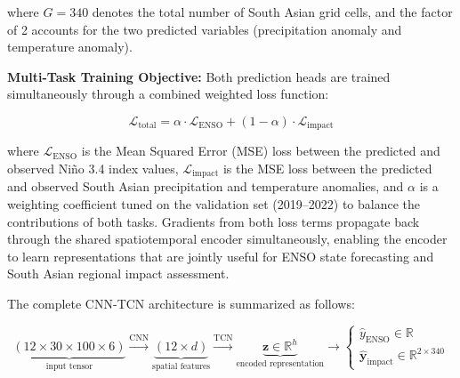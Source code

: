 \noindent where $G = 340$ denotes the total number of South Asian grid cells, and the factor of 2 accounts for the two predicted variables (precipitation anomaly and temperature anomaly).

\textbf{Multi-Task Training Objective:} Both prediction heads are trained simultaneously through a combined weighted loss function:

\begin{equation}
\mathcal{L}_{\text{total}} = \alpha \cdot \mathcal{L}_{\text{ENSO}} + (1 - \alpha) \cdot \mathcal{L}_{\text{impact}}
\end{equation}

\noindent where $\mathcal{L}_{\text{ENSO}}$ is the Mean Squared Error (MSE) loss between the predicted and observed Ni\~{n}o 3.4 index values, $\mathcal{L}_{\text{impact}}$ is the MSE loss between the predicted and observed South Asian precipitation and temperature anomalies, and $\alpha$ is a weighting coefficient tuned on the validation set (2019--2022) to balance the contributions of both tasks. Gradients from both loss terms propagate back through the shared spatiotemporal encoder simultaneously, enabling the encoder to learn representations that are jointly useful for ENSO state forecasting and South Asian regional impact assessment.

The complete CNN-TCN architecture is summarized as follows:

\begin{equation}
\underbrace{(12 \times 30 \times 100 \times 6)}_{\text{input tensor}}
\xrightarrow{\text{CNN}}
\underbrace{(12 \times d)}_{\text{spatial features}}
\xrightarrow{\text{TCN}}
\underbrace{\mathbf{z} \in \mathbb{R}^{h}}_{\text{encoded representation}}
\xrightarrow{}
\begin{cases}
\hat{y}_{\text{ENSO}} \in \mathbb{R} \\
\hat{\mathbf{y}}_{\text{impact}} \in \mathbb{R}^{2 \times 340}
\end{cases}
\end{equation}